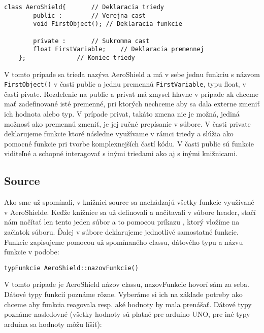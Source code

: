 \begin{lstlisting}[caption={Triedy a objekty.},captionpos=b]
	class AeroShield{		// Deklaracia triedy
		public :		// Verejna cast
		void FirstObject();	// Deklaracia funkcie
		
		private :		// Sukromna cast
		float FirstVariable;	// Deklaracia premennej
	};				// Koniec triedy
\end{lstlisting}

V tomto prípade sa trieda nazýva AeroShield a má v sebe jednu funkciu s názvom \verb|FirstObject()| v časti public a jednu premennú \verb|FirstVariable|, typu float, v časti pivate. Rozdelenie na public a privat má zmysel hlavne v prípade ak chceme mať zadefinované isté premenné, pri ktorých nechceme aby sa dala externe zmeniť ich hodnota alebo typ. V prípade privat, takáto zmena nie je možná, jediná možnosť ako premennú zmeniť, je jej ručné prepísanie v súbore. V časti private deklarujeme funkcie ktoré následne využívame v rámci triedy a slúžia ako pomocné funkcie pri tvorbe komplexnejších častí kódu. V časti public sú funkcie viditeľné a schopné interagovať s inými triedami ako aj s inými knižnicami. 

\newpage
\subsection{Source}

Ako sme už spomínali, v knižnici source sa nachádzajú všetky funkcie využívané v AeroShielde. Keďže knižnice sa už definovali a načítavali v súbore header, stačí nám načítať len tento jeden súbor a to pomocou príkazu , ktorý vložíme na začiatok súboru. Ďalej v súbore deklarujeme jednotlivé samostatné funkcie. Funkcie zapisujeme pomocou už spomínaného classu, dátového typu a názvu funkcie v podobe:
\begin{lstlisting}[caption={Source volanie funkcie.},captionpos=b]
typFunkcie AeroShield::nazovFunkcie()
\end{lstlisting}
V tomto prípade je AeroShield názov classu, nazovFunkcie hovorí sám za seba. Dátové typy funkcií poznáme rôzne. Vyberáme si ich na základe potreby ako chceme aby funkcia reagovala resp. aké hodnoty by mala prenášať. Dátové typy poznáme nasledovné\cite{datovetypy} (všetky hodnoty sú platné pre arduino UNO, pre iné typy arduina sa hodnoty môžu líšiť): 

